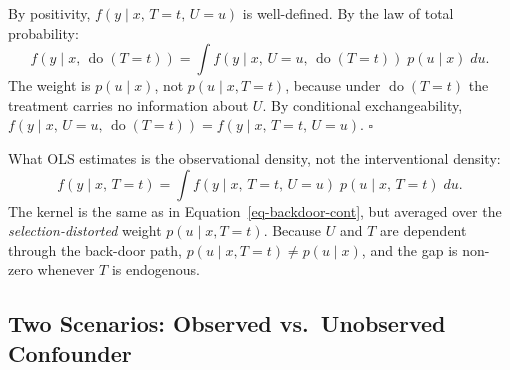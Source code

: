 \documentclass[
  a4paper,
]{book}
\newcommand{\doop}{\operatorname{do}}
\begin{document}
\begin{tcolorbox}[enhanced jigsaw, arc=.35mm, bottomrule=.15mm, bottomtitle=1mm, breakable, colback=white, colbacktitle=quarto-callout-note-color!10!white, colframe=quarto-callout-note-color-frame, coltitle=black, left=2mm, leftrule=.75mm, opacityback=0, opacitybacktitle=0.6, rightrule=.15mm, title={Proof}, titlerule=0mm, toprule=.15mm, toptitle=1mm]

By positivity, \(f(y \mid x,\, T{=}t,\, U{=}u)\) is well-defined. By the
law of total probability:
\[f(y \mid x,\, \doop(T{=}t)) = \int f(y \mid x,\, U{=}u,\, \doop(T{=}t))\; p(u \mid x)\; du.\]
The weight is \(p(u \mid x)\), not \(p(u \mid x, T{=}t)\), because under
\(\doop(T{=}t)\) the treatment carries no information about \(U\). By
conditional exchangeability,
\(f(y \mid x,\, U{=}u,\, \doop(T{=}t)) = f(y \mid x,\, T{=}t,\, U{=}u)\).
\(\square\)

\end{tcolorbox}

\begin{tcolorbox}[enhanced jigsaw, arc=.35mm, bottomrule=.15mm, bottomtitle=1mm, breakable, colback=white, colbacktitle=quarto-callout-note-color!10!white, colframe=quarto-callout-note-color-frame, coltitle=black, left=2mm, leftrule=.75mm, opacityback=0, opacitybacktitle=0.6, rightrule=.15mm, title={Remark: Confounding Discrepancy}, titlerule=0mm, toprule=.15mm, toptitle=1mm]

What OLS estimates is the observational density, not the interventional
density:
\[f(y \mid x,\, T{=}t) = \int f(y \mid x,\, T{=}t,\, U{=}u)\; p(u \mid x,\, T{=}t)\; du.\]
The kernel is the same as in Equation~\ref{eq-backdoor-cont}, but
averaged over the \emph{selection-distorted} weight
\(p(u \mid x, T{=}t)\). Because \(U\) and \(T\) are dependent through
the back-door path, \(p(u \mid x, T{=}t) \neq p(u \mid x)\), and the gap
is non-zero whenever \(T\) is endogenous.

\end{tcolorbox}

\subsection{Two Scenarios: Observed vs.~Unobserved
Confounder}\label{two-scenarios-observed-vs.-unobserved-confounder}
\end{document}
